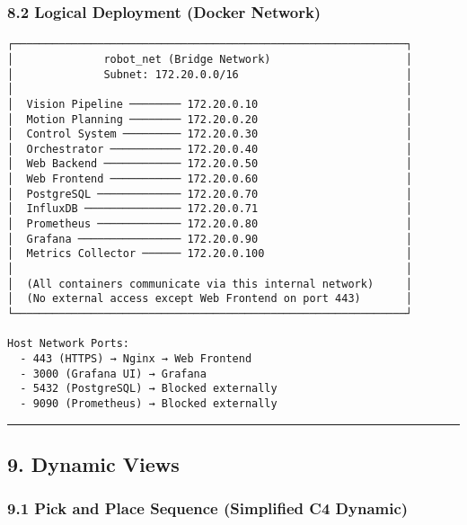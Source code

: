 \documentclass[
]{article}
\begin{document}
\hypertarget{logical-deployment-docker-network}{%
\subsubsection{8.2 Logical Deployment (Docker
Network)}\label{logical-deployment-docker-network}}

\begin{verbatim}
┌─────────────────────────────────────────────────────────────┐
│              robot_net (Bridge Network)                     │
│              Subnet: 172.20.0.0/16                          │
│                                                             │
│  Vision Pipeline ──────── 172.20.0.10                       │
│  Motion Planning ──────── 172.20.0.20                       │
│  Control System ───────── 172.20.0.30                       │
│  Orchestrator ─────────── 172.20.0.40                       │
│  Web Backend ──────────── 172.20.0.50                       │
│  Web Frontend ─────────── 172.20.0.60                       │
│  PostgreSQL ───────────── 172.20.0.70                       │
│  InfluxDB ─────────────── 172.20.0.71                       │
│  Prometheus ───────────── 172.20.0.80                       │
│  Grafana ──────────────── 172.20.0.90                       │
│  Metrics Collector ────── 172.20.0.100                      │
│                                                             │
│  (All containers communicate via this internal network)     │
│  (No external access except Web Frontend on port 443)       │
└─────────────────────────────────────────────────────────────┘

Host Network Ports:
  - 443 (HTTPS) → Nginx → Web Frontend
  - 3000 (Grafana UI) → Grafana
  - 5432 (PostgreSQL) → Blocked externally
  - 9090 (Prometheus) → Blocked externally
\end{verbatim}

\begin{center}\rule{0.5\linewidth}{0.5pt}\end{center}

\hypertarget{dynamic-views}{%
\subsection{9. Dynamic Views}\label{dynamic-views}}

\hypertarget{pick-and-place-sequence-simplified-c4-dynamic}{%
\subsubsection{9.1 Pick and Place Sequence (Simplified C4
Dynamic)}\label{pick-and-place-sequence-simplified-c4-dynamic}}
\end{document}
